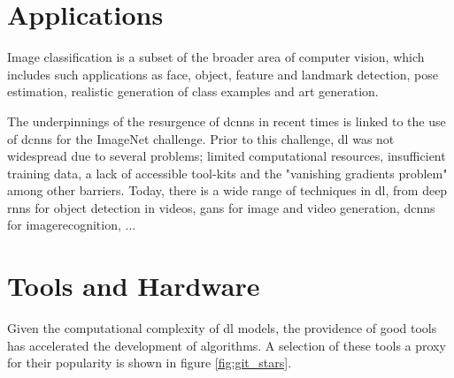 

\section{Applications}

Image classification is a subset of the broader area of computer vision, which includes such applications as face, object, feature and landmark detection, pose estimation, realistic generation of class examples and art generation.  
\bigskip

The underpinnings of the resurgence of \gls{dcnn}s in recent times is linked to the use of \gls{dcnn}s for the ImageNet challenge. Prior to this challenge, \gls{dl} was not widespread due to several problems; limited computational resources, insufficient training data, a lack of accessible tool-kits and the  "vanishing gradients problem" \cite[Chapter~8]{good_fellow_2016} \cite[p.~93-94]{dl_overview} among other barriers. Today, there is a wide range of techniques in \gls{dl}, from deep \gls{rnn}s for object detection in videos, \gls{gan}s for image and video generation, \gls{dcnn}s for \gls{imagerecognition}, ... 


\section{Tools and Hardware}

Given the computational complexity of  \gls{dl} models, the providence of good tools has accelerated the development of algorithms. A selection of these tools a proxy for their popularity is shown in figure \ref{fig:git_stars}.

